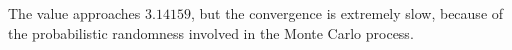 \documentclass[12pt]{article}
\begin{document}
  The value approaches $3.14159$, but the convergence is extremely slow, because of the probabilistic randomness involved in the Monte Carlo process.
  


      
\end{document}
